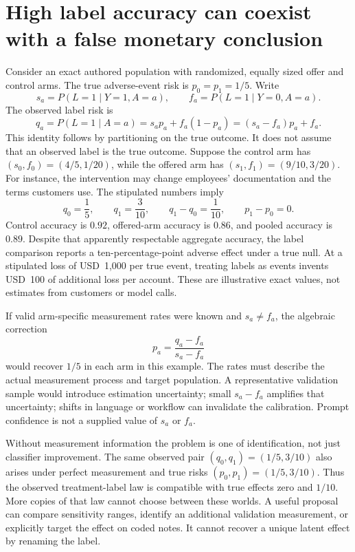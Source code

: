 \section{High label accuracy can coexist with a false monetary conclusion}

Consider an exact authored population with randomized, equally sized offer
and control arms. The true adverse-event risk is \(p_0=p_1=1/5\). Write
\[
 s_a=P(L=1\mid Y=1,A=a),\qquad
 f_a=P(L=1\mid Y=0,A=a).
\]
The observed label risk is
\[
 q_a=P(L=1\mid A=a)=s_ap_a+f_a(1-p_a)
     =(s_a-f_a)p_a+f_a.
\]
This identity follows by partitioning on the true outcome. It does not
assume that an observed label is the true outcome. Suppose the control arm has
\((s_0,f_0)=(4/5,1/20)\), while the offered arm has
\((s_1,f_1)=(9/10,3/20)\). For instance, the intervention may change employees'
documentation and the terms customers use. The stipulated numbers imply
\[
 q_0=\frac15,\qquad q_1=\frac3{10},\qquad q_1-q_0=\frac1{10},
 \qquad p_1-p_0=0.
\]
Control accuracy is \(0.92\), offered-arm accuracy is \(0.86\), and pooled
accuracy is \(0.89\). Despite that apparently respectable aggregate accuracy,
the label comparison reports a ten-percentage-point adverse effect under a
true null. At a stipulated loss of USD~1,000 per true event, treating labels
as events invents USD~100 of additional loss per account. These are
illustrative exact values, not estimates from customers or model
calls.\citep{exec17_ontology_oracle}

If valid arm-specific measurement rates were known and \(s_a\ne f_a\), the
algebraic correction
\[
 p_a=\frac{q_a-f_a}{s_a-f_a}
\]
would recover \(1/5\) in each arm in this example. The rates must describe the
actual measurement process and target population. A representative validation
sample would introduce estimation uncertainty; small \(s_a-f_a\) amplifies
that uncertainty; shifts in language or workflow can invalidate the
calibration. Prompt confidence is not a supplied value of \(s_a\) or \(f_a\).

Without measurement information the problem is one of identification, not
just classifier improvement. The same observed pair
\((q_0,q_1)=(1/5,3/10)\) also arises under perfect measurement and true risks
\((p_0,p_1)=(1/5,3/10)\). Thus the observed treatment-label law is compatible
with true effects zero and \(1/10\). More copies of that law cannot choose
between these worlds. A useful proposal can compare sensitivity ranges,
identify an additional validation measurement, or explicitly target the
effect on coded notes. It cannot recover a unique latent effect by renaming
the label.

